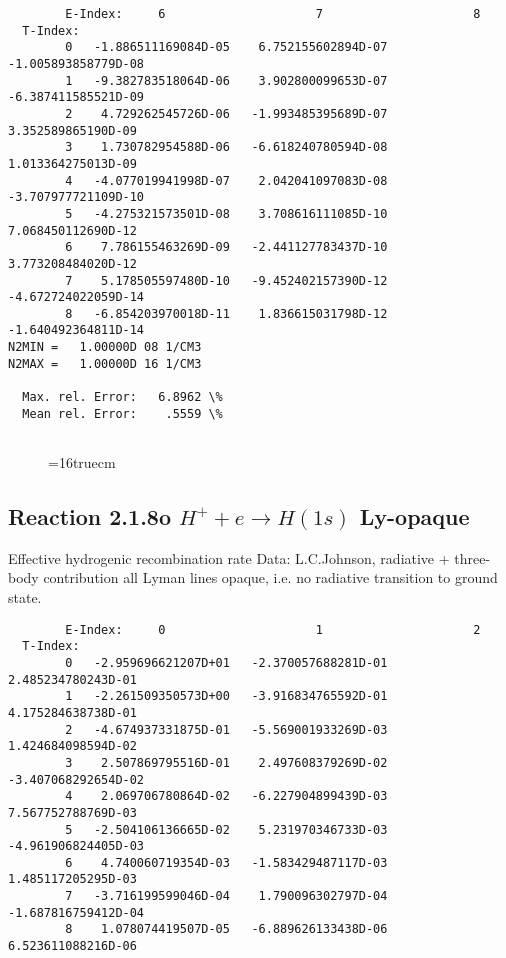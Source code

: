 \documentclass[12pt,dvipdfmx]{article}
\begin{document}
{\begin{small}
\begin{verbatim}
        E-Index:     6                     7                     8
  T-Index:
        0   -1.886511169084D-05    6.752155602894D-07   -1.005893858779D-08
        1   -9.382783518064D-06    3.902800099653D-07   -6.387411585521D-09
        2    4.729262545726D-06   -1.993485395689D-07    3.352589865190D-09
        3    1.730782954588D-06   -6.618240780594D-08    1.013364275013D-09
        4   -4.077019941998D-07    2.042041097083D-08   -3.707977721109D-10
        5   -4.275321573501D-08    3.708616111085D-10    7.068450112690D-12
        6    7.786155463269D-09   -2.441127783437D-10    3.773208484020D-12
        7    5.178505597480D-10   -9.452402157390D-12   -4.672724022059D-14
        8   -6.854203970018D-11    1.836615031798D-12   -1.640492364811D-14
N2MIN =   1.00000D 08 1/CM3
N2MAX =   1.00000D 16 1/CM3

  Max. rel. Error:   6.8962 \%
  Mean rel. Error:    .5559 \%


\end{verbatim}\end{small}
\begin{figure} \label{2.1.8}
\epsfxsize=16truecm
\end{figure}
\newpage

\subsection{
  Reaction 2.1.8o $ H^+ + e \rightarrow H(1s) $ Ly-opaque
}

   Effective hydrogenic recombination rate
   Data: L.C.Johnson, radiative + three-body contribution
   all Lyman lines opaque, i.e. no radiative transition to ground state.


\begin{small}\begin{verbatim}
        E-Index:     0                     1                     2
  T-Index:
        0   -2.959696621207D+01   -2.370057688281D-01    2.485234780243D-01
        1   -2.261509350573D+00   -3.916834765592D-01    4.175284638738D-01
        2   -4.674937331875D-01   -5.569001933269D-03    1.424684098594D-02
        3    2.507869795516D-01    2.497608379269D-02   -3.407068292654D-02
        4    2.069706780864D-02   -6.227904899439D-03    7.567752788769D-03
        5   -2.504106136665D-02    5.231970346733D-03   -4.961906824405D-03
        6    4.740060719354D-03   -1.583429487117D-03    1.485117205295D-03
        7   -3.716199599046D-04    1.790096302797D-04   -1.687816759412D-04
        8    1.078074419507D-05   -6.889626133438D-06    6.523611088216D-06


\end{verbatim}
\end{small}}
\end{document}
